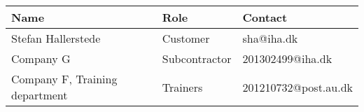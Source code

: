 \begin{center}
    \begin{tabular}{ | l | l | l |}
    \hline
    Name&Role & Contact         									 \\ \hline
	Stefan Hallerstede &Customer & sha@iha.dk \\ 
	Company G & Subcontractor & 201302499@iha.dk\\
	Company F, Training department & Trainers & 201210732@post.au.dk\\
	
    \hline
    \end{tabular}
\end{center}